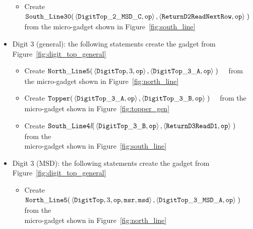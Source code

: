 \begin{itemize}
\begin{itemize}
            \item Create
            $\begin{aligned}[t]
                {\tt South\_Line30}(& \left\langle {\tt DigitTop\_2\_MSD\_C}, {\tt op} \right\rangle,
                                      \left\langle {\tt ReturnD2ReadNextRow}, {\tt op} \right\rangle \;)
            \end{aligned}$ from the micro-gadget shown in Figure~\ref{fig:south_line}
        \end{itemize}
        \vspace{1cm}


        \item Digit 3 (general): the following statements create the gadget from Figure~\ref{fig:digit_top_general}
        \begin{itemize}
            \item Create
            $\begin{aligned}[t]
                {\tt North\_Line5}(& \left \langle {\tt DigitTop}, 3,    {\tt op} \right\rangle,
                                     \left \langle {\tt DigitTop\_3\_A}, {\tt op} \right\rangle \;)
            \end{aligned}$ from the micro-gadget shown in Figure~\ref{fig:north_line}

            \item Create
            $\begin{aligned}[t]
                {\tt Topper}(& \left \langle {\tt DigitTop\_3\_A}, {\tt op} \right\rangle,
                               \left \langle {\tt DigitTop\_3\_B}, {\tt op} \right\rangle \;)
            \end{aligned}$ from the micro-gadget shown in Figure~\ref{fig:topper_gen}

            \item Create
            $\begin{aligned}[t]
                {\tt South\_Line4\textit{l}}(& \left \langle {\tt DigitTop\_3\_B}, {\tt op} \right\rangle,
                                               \left \langle {\tt ReturnD3ReadD1}, {\tt op} \right\rangle \;)
            \end{aligned}$ from the\\micro-gadget shown in Figure~\ref{fig:south_line}
        \end{itemize}
        \vspace{1cm}


        \item Digit 3 (MSD): the following statements create the gadget from Figure~\ref{fig:digit_top_general}
        \begin{itemize}
            \item Create
            $\begin{aligned}[t]
                {\tt North\_Line5}(& \left\langle {\tt DigitTop}, 3,         {\tt op}, {\tt msr}, {\tt msd} \right\rangle,
                                     \left\langle {\tt DigitTop\_3\_MSD\_A}, {\tt op}                       \right\rangle \;)
            \end{aligned}$ from the\\micro-gadget shown in Figure~\ref{fig:north_line}


\end{itemize}
\end{itemize}
